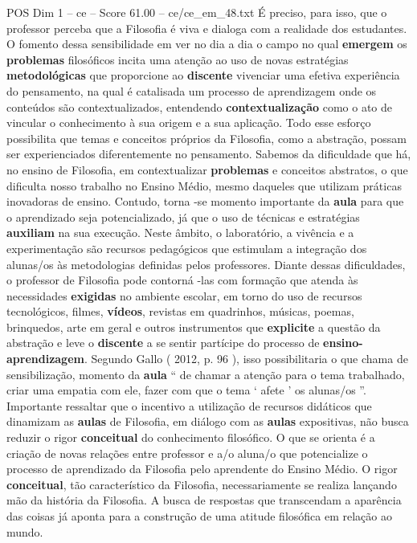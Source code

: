 \begin{textsample}{POS Dim 1 – ce – Score 61.00 – ce/ce\_em\_48.txt}
É preciso, para isso, que o professor perceba que a Filosofia é viva e dialoga com a realidade dos estudantes.
O fomento dessa sensibilidade em ver no dia a dia o campo no qual \textbf{emergem} os \textbf{problemas} filosóficos incita uma atenção ao uso de novas estratégias \textbf{metodológicas} que proporcione ao \textbf{discente} vivenciar uma efetiva experiência do pensamento, na qual é catalisada um processo de aprendizagem onde os conteúdos são contextualizados, entendendo \textbf{contextualização} como o ato de vincular o conhecimento à sua origem e a sua aplicação.
Todo esse esforço possibilita que temas e conceitos próprios da Filosofia, como a abstração, possam ser experienciados diferentemente no pensamento.
Sabemos da dificuldade que há, no ensino de Filosofia, em contextualizar \textbf{problemas} e conceitos abstratos, o que dificulta nosso trabalho no Ensino Médio, mesmo daqueles que utilizam práticas inovadoras de ensino.
Contudo, torna -se momento importante da \textbf{aula} para que o aprendizado seja potencializado, já que o uso de técnicas e estratégias \textbf{auxiliam} na sua execução.
Neste âmbito, o laboratório, a vivência e a experimentação são recursos pedagógicos que estimulam a integração dos alunas/os às metodologias definidas pelos professores.
Diante dessas dificuldades, o professor de Filosofia pode contorná -las com formação que atenda às necessidades \textbf{exigidas} no ambiente escolar, em torno do uso de recursos tecnológicos, filmes, \textbf{vídeos}, revistas em quadrinhos, músicas, poemas, brinquedos, arte em geral e outros instrumentos que \textbf{explicite} a questão da abstração e leve o \textbf{discente} a se sentir partícipe do processo de \textbf{ensino-aprendizagem}.
Segundo Gallo ( 2012, p. 96 ), isso possibilitaria o que chama de sensibilização, momento da \textbf{aula} “ de chamar a atenção para o tema trabalhado, criar uma empatia com ele, fazer com que o tema ‘ afete ’ os alunas/os ”.
Importante ressaltar que o incentivo a utilização de recursos didáticos que dinamizam as \textbf{aulas} de Filosofia, em diálogo com as \textbf{aulas} expositivas, não busca reduzir o rigor \textbf{conceitual} do conhecimento filosófico.
O que se orienta é a criação de novas relações entre professor e a/o aluna/o que potencialize o processo de aprendizado da Filosofia pelo aprendente do Ensino Médio.
O rigor \textbf{conceitual}, tão característico da Filosofia, necessariamente se realiza lançando mão da história da Filosofia.
A busca de respostas que transcendam a aparência das coisas já aponta para a construção de uma atitude filosófica em relação ao mundo.

\end{textsample}
